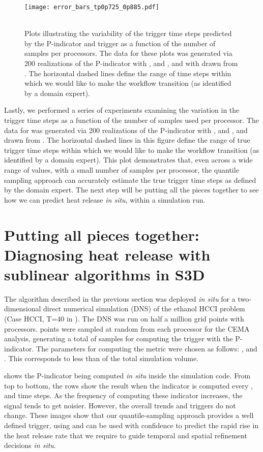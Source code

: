 \documentclass[final]{siamltex}
\newcommand{\pmetric}{P}
\begin{document}
\begin{figure}[htpb]
\texttt{[image: error\_bars\_tp0p725\_0p885.pdf]} \\ \\
\caption{\label{fig:Triggers} Plots illustrating the variability of the trigger
time steps 
predicted by the \pmetric-indicator and trigger as a function of the number of
samples per processors.  The data for these plots was generated via 200
realizations of the \pmetric-indicator with ,  and
, and with  drawn from . 
 The horizontal dashed lines define the range of time steps within
which we would like to make the workflow transition (as identified by a domain expert).
}  
\end{figure}

Lastly, we performed a series of experiments examining the variation in the trigger time steps 
as a function of the number of samples used per processor.  The data for
 was generated via 200 realizations of  the \pmetric-indicator with ,  and
, and  drawn from . The
horizontal dashed lines in this figure define the range of true trigger time steps within
which we would like to make the workflow transition (as identified by a domain expert).
This plot demonstrates that, even across a wide range of 
values,  with a small number of samples per processor, the quantile sampling
approach can accurately estimate the  true trigger time steps as defined by the
domain expert. 
The next step will be  putting all
the pieces  together  to see how we can predict heat release \emph{in situ},
within a simulation run. 

\section{Putting all pieces together: Diagnosing heat release  with sublinear algorithms in S3D}
\label{sec:app}
  
The algorithm described in the previous section was deployed \emph{in situ} for a two-dimensional 
direct numerical simulation (DNS) of the ethanol HCCI problem (Case HCCI, T=40
in ).  
The DNS was run on half a million grid points with  processors.  points
were sampled at random 
from each processor for the CEMA analysis, generating a total of 
samples for computing the trigger with the \pmetric-indicator. 
The parameters for computing the metric were chosen as follows: ,  and .
This corresponds to less than  of the total simulation volume. 

  shows the \pmetric-indicator being computed \emph{in situ} inside the simulation code. 
From top to bottom, the rows show the result when the indicator is computed every ,
 and  time steps.  As the frequency of computing these indicator increases, 
the signal tends to get noisier. However, the overall trends and triggers do not change.   
These images show that our quantile-sampling approach provides a well defined trigger, using  and can be used with confidence to predict the rapid rise in the heat release rate that we require to 
guide temporal and spatial refinement decisions \emph{in situ}. 
\end{document}

